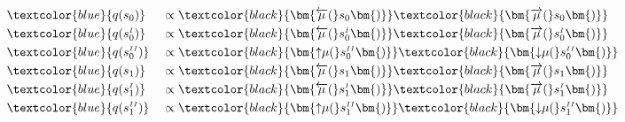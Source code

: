 \noindent
\begin{minipage}[t]{0.5\textwidth}
    \setlength{\abovedisplayskip}{0pt}
    \setlength{\belowdisplayskip}{0pt}
    \begin{alignat}{2}
         & \textcolor{blue}{q(s_0)}                         &  & \propto \textcolor{black}{\bm{\overleftarrow{\mu}(}s_0\bm{)}} \textcolor{black}{\bm{\overrightarrow{\mu}(}s_0\bm{)}}                                               \\
         & \textcolor{blue}{q(s^{\scriptscriptstyle I}_0)}  &  & \propto \textcolor{black}{\bm{\overleftarrow{\mu}(}s^{\scriptscriptstyle I}_0\bm{)}} \textcolor{black}{\bm{\overrightarrow{\mu}(}s^{\scriptscriptstyle I}_0\bm{)}} \\
         & \textcolor{blue}{q(s^{\scriptscriptstyle II}_0)} &  & \propto \textcolor{black}{\bm{{\uparrow}{\mu}(}s^{\scriptscriptstyle II}_0\bm{)}} \textcolor{black}{\bm{{\downarrow}{\mu}(}s^{\scriptscriptstyle II}_0\bm{)}}      \\
         & \textcolor{blue}{q(s_1)}                         &  & \propto \textcolor{black}{\bm{\overleftarrow{\mu}(}s_1\bm{)}} \textcolor{black}{\bm{\overrightarrow{\mu}(}s_1\bm{)}}                                               \\
         & \textcolor{blue}{q(s^{\scriptscriptstyle I}_1)}  &  & \propto \textcolor{black}{\bm{\overleftarrow{\mu}(}s^{\scriptscriptstyle I}_1\bm{)}} \textcolor{black}{\bm{\overrightarrow{\mu}(}s^{\scriptscriptstyle I}_1\bm{)}} \\
         & \textcolor{blue}{q(s^{\scriptscriptstyle II}_1)} &  & \propto \textcolor{black}{\bm{{\uparrow}{\mu}(}s^{\scriptscriptstyle II}_1\bm{)}} \textcolor{black}{\bm{{\downarrow}{\mu}(}s^{\scriptscriptstyle II}_1\bm{)}}
    \end{alignat}
\end{minipage}\hfill
